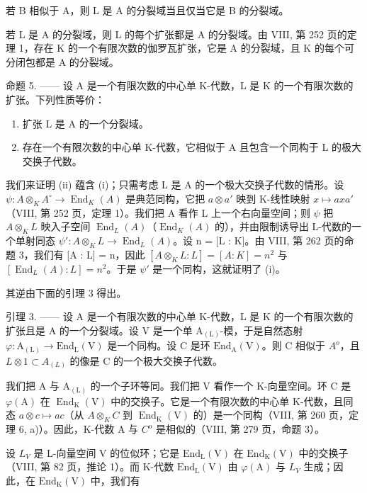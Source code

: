 若 B 相似于 A，则 L 是 A 的分裂域当且仅当它是 B 的分裂域。

若 L 是 A 的分裂域，则 L 的每个扩张都是 A 的分裂域。由 VIII, 第 252 页的定理 1，存在 K 的一个有限次数的伽罗瓦扩张，它是 A 的分裂域，且 K 的每个可分闭包都是 A 的分裂域。

命题 5. —— 设 A 是一个有限次数的中心单 K-代数，L 是 K 的一个有限次数的扩张。下列性质等价：

\begin{enumerate}
\def\labelenumi{(\roman{enumi})}
\item
  扩张 L 是 A 的一个分裂域。
\item
  存在一个有限次数的中心单 K-代数，它相似于 A 且包含一个同构于 L 的极大交换子代数。
\end{enumerate}

我们来证明 (ii) 蕴含 (i)；只需考虑 L 是 A 的一个极大交换子代数的情形。设 \(\psi: A \otimes_{K} A^{\circ} \to \operatorname{End}_{K}(A)\) 是典范同构，它把 \(a \otimes a'\) 映到 K-线性映射 \(x \mapsto axa'\)（VIII, 第 252 页，定理 1）。我们把 A 看作 L 上一个右向量空间；则 \(\psi\) 把 \(A \otimes_{K} L\) 映入子空间 \(\operatorname{End}_{L}(A)\)（\(\operatorname{End}_{K}(A)\) 的），并由限制诱导出 L-代数的一个单射同态 \(\psi': A \otimes_{K} L \to \operatorname{End}_{L}(A)\)。设 n = {[}L : K{]}。由 VIII, 第 262 页的命题 3，我们有 {[}A : L{]} = n，因此 \([A \otimes_{K} L : L] = [A : K] = n^{2}\) 与 \([\operatorname{End}_{L}(A) : L] = n^{2}\)。于是 \(\psi'\) 是一个同构，这就证明了 (i)。

其逆由下面的引理 3 得出。

引理 3. —— 设 A 是一个有限次数的中心单 K-代数，L 是 K 的一个有限次数的扩张且是 A 的一个分裂域。设 V 是一个单 \(\mathrm{A}_{(\mathrm{L})}\)-模，于是自然态射 \(\varphi: \mathrm{A}_{(\mathrm{L})} \to \mathrm{End}_{\mathrm{L}}(\mathrm{V})\) 是一个同构。设 C 是环 \(\mathrm{End}_{\mathrm{A}}(\mathrm{V})\)。则 C 相似于 \(A^{o}\)，且 \(L \otimes 1 \subset A_{(L)}\) 的像是 C 的一个极大交换子代数。

我们把 A 与 \(\mathrm{A}_{(\mathrm{L})}\) 的一个子环等同。我们把 V 看作一个 K-向量空间。环 C 是 \(\varphi(\mathrm{A})\) 在 \(\operatorname{End}_{\mathrm{K}}(\mathrm{V})\) 中的交换子。它是一个有限次数的中心单 K-代数，且同态 \(a \otimes c \mapsto ac\)（从 \(A \otimes_{K} C\) 到 \(\operatorname{End}_{\mathrm{K}}(\mathrm{V})\) 的）是一个同构（VIII, 第 260 页，定理 6, a)）。因此，K-代数 A 与 \(C^{o}\) 是相似的（VIII, 第 279 页，命题 3）。

设 \(L_{V}\) 是 L-向量空间 V 的位似环；它是 \(\mathrm{End}_{\mathrm{L}}(\mathrm{V})\) 在 \(\mathrm{End}_{\mathrm{K}}(\mathrm{V})\) 中的交换子（VIII, 第 82 页，推论 1）。而 K-代数 \(\mathrm{End}_{\mathrm{L}}(\mathrm{V})\) 由 \(\varphi(\mathrm{A})\) 与 \(L_{V}\) 生成；因此，在 \(\mathrm{End}_{\mathrm{K}}(\mathrm{V})\) 中，我们有

